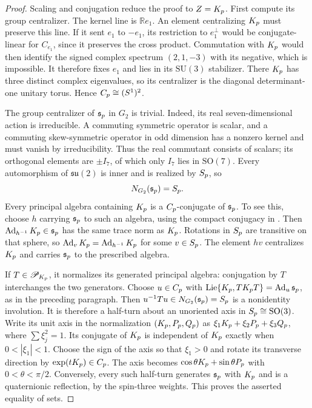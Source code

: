\documentclass[10pt,a4paper]{amsart}
\newcommand{\Ad}{\operatorname{Ad}}
\newcommand{\Lie}{\operatorname{Lie}}
\newcommand{\RR}{\mathbb R}
\newcommand{\SO}{\mathrm{SO}}
\newcommand{\SU}{\mathrm{SU}}
\begin{document}
\begin{proof}
Scaling and conjugation reduce the proof to $Z=K_{\rm p}$.
First compute its group centralizer.  The kernel line is $\RR e_1$.  An element centralizing $K_{\rm p}$ must preserve this line.
If it sent $e_1$ to $-e_1$, its restriction to $e_1^\perp$ would be conjugate-linear for $C_{e_1}$, since it preserves the cross product.
Commutation with $K_{\rm p}$ would then identify the signed complex spectrum $(2,1,-3)$ with its negative, which is impossible.
It therefore fixes $e_1$ and lies in its $\SU(3)$ stabilizer.
There $K_{\rm p}$ has three distinct complex eigenvalues, so its centralizer is the diagonal determinant-one unitary torus.  Hence $C_{\rm p}\cong(S^1)^2$.

The group centralizer of $\mathfrak s_{\rm p}$ in $G_2$ is trivial.  Indeed, its real seven-dimensional action is irreducible.
A commuting symmetric operator is scalar, and a commuting skew-symmetric operator in odd dimension has a nonzero kernel and must vanish by irreducibility.
Thus the real commutant consists of scalars; its orthogonal elements are $\pm I_7$, of which only $I_7$ lies in $\SO(7)$.
Every automorphism of $\mathfrak{su}(2)$ is inner and is realized by $S_{\rm p}$, so
\[
N_{G_2}(\mathfrak s_{\rm p})=S_{\rm p}.
\]
Every principal algebra containing $K_{\rm p}$ is a $C_{\rm p}$-conjugate of $\mathfrak s_{\rm p}$.
To see this, choose $h$ carrying $\mathfrak s_{\rm p}$ to such an algebra, using the compact conjugacy in .
Then $\Ad_{h^{-1}}K_{\rm p}\in\mathfrak s_{\rm p}$ has the same trace norm as $K_{\rm p}$.
Rotations in $S_{\rm p}$ are transitive on that sphere, so $\Ad_vK_{\rm p}=\Ad_{h^{-1}}K_{\rm p}$ for some $v\in S_{\rm p}$.
The element $hv$ centralizes $K_{\rm p}$ and carries $\mathfrak s_{\rm p}$ to the prescribed algebra.

If $T\in\mathscr P_{K_{\rm p}}$, it normalizes its generated principal algebra: conjugation by $T$ interchanges the two generators.
Choose $u\in C_{\rm p}$ with $\Lie\{K_{\rm p},TK_{\rm p}T\}=\Ad_u\mathfrak s_{\rm p}$, as in the preceding paragraph.
Then $u^{-1}Tu\in N_{G_2}(\mathfrak s_{\rm p})=S_{\rm p}$ is a nonidentity involution.
It is therefore a half-turn about an unoriented axis in $S_{\rm p}\cong\SO(3)$.  Write its unit axis in the normalization $(K_{\rm p},P_{\rm p},Q_{\rm p})$ as
$\xi_1K_{\rm p}+\xi_2P_{\rm p}+\xi_3Q_{\rm p}$, where $\sum\xi_j^2=1$.
Its conjugate of $K_{\rm p}$ is independent of $K_{\rm p}$ exactly when $0<|\xi_1|<1$.
Choose the sign of the axis so that $\xi_1>0$ and rotate its transverse direction by $\exp(tK_{\rm p})\in C_{\rm p}$.
The axis becomes $\cos\theta K_{\rm p}+\sin\theta P_{\rm p}$ with $0<\theta<\pi/2$.
Conversely, every such half-turn generates $\mathfrak s_{\rm p}$ with $K_{\rm p}$ and is a quaternionic reflection, by the spin-three weights.
This proves the asserted equality of sets.


\end{proof}
\end{document}
